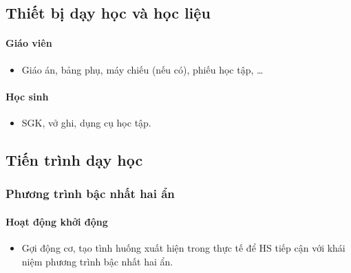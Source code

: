 \subsection{Thiết bị dạy học và học liệu}

\paragraph{Giáo viên}

\begin{itemize}
    \item Giáo án, bảng phụ, máy chiếu (nếu có), phiếu học tập, … 
\end{itemize}

\paragraph{Học sinh}

\begin{itemize}
    \item SGK, vở ghi, dụng cụ học tập. 
\end{itemize}

\subsection{Tiến trình dạy học}

\danhsachtiet

\subsubsection{Phương trình bậc nhất hai ẩn}

\paragraph{Hoạt động khởi động}

\muctieu

\begin{itemize}
    \item Gợi động cơ, tạo tình huống xuất hiện trong thực tế để HS tiếp cận với khái niệm
    phương trình bậc nhất hai ẩn.
\end{itemize}

\noidungsanpham

